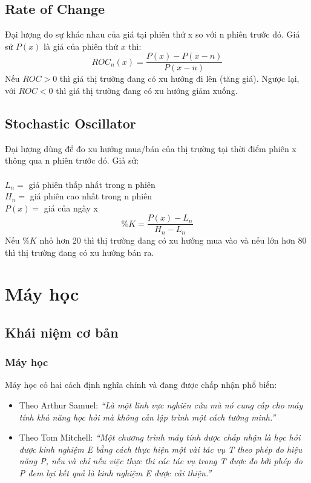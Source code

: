 \subsection{Rate of Change}
Đại lượng đo sự khác nhau của giá tại phiên thứ x so với n phiên trước đó. 
Giá sử $P(x)$ là giá của phiên thứ $x$ thì:
\[ ROC_{n}(x)=\frac{P(x)-P(x-n)}{P(x-n)}\]
Nếu $ROC > 0$ thì giá thị trường đang có xu hướng đi lên (tăng giá).
Ngược lại, với $ROC < 0$ thì giá thị trường đang có xu hướng giảm xuống.
\subsection{Stochastic Oscillator}
Đại lượng dùng để đo xu hướng mua/bán của thị trường tại thời điểm phiên x thông 
qua n phiên trước đó. Giả sử:\\\\
\tab $L_{n} = $ giá phiên thấp nhất trong n phiên\\
\tab $H_{n} = $ giá phiên cao nhất trong n phiên\\
\tab $P(x) = $ giá của ngày x\\
\[\%K=\frac{P(x)-L_{n}}{H_{n}-L_{n}}\]
Nếu $ \%K $ nhỏ hơn 20 thì thị trường đang có xu hướng mua vào và nếu lớn hơn 
80 thì thị trường đang có xu hướng bán ra.


\section{Máy học}

\subsection{Khái niệm cơ bản}
\subsubsection{Máy học}
Máy học có hai cách định nghĩa chính và đang được chấp nhận phổ biến:
\begin{itemize}
  \item Theo Arthur Samuel: \textit{``Là một lĩnh vực nghiên cứu mà nó cung cấp cho
  máy tính khả năng học hỏi mà không cần lập trình một cách tường minh.''}
  \item Theo Tom Mitchell: \textit{``Một chương trình máy tính được chấp nhận
  là học hỏi được kinh nghiệm E bằng cách thực hiện một vài tác vụ T theo phép đo hiệu
  năng P, nếu và chỉ nếu việc thực thi các tác vụ trong T được đo bởi phép đo P
  đem lại kết quả là kinh nghiệm E được cải thiện.''}
\end{itemize}

